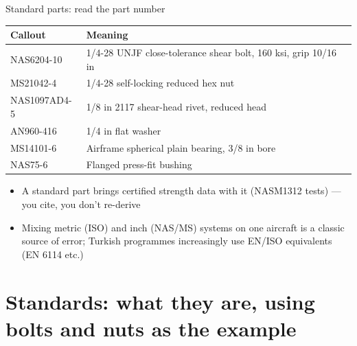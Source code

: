 \documentclass[aspectratio=169,10pt]{beamer}
\begin{document}
\begin{frame}{Standard parts: read the part number}
\footnotesize
\begin{tabular}{@{}ll@{}}
\toprule
Callout & Meaning \\
\midrule
NAS6204-10 & 1/4-28 UNJF close-tolerance shear bolt, 160 ksi, grip 10/16 in \\
MS21042-4 & 1/4-28 self-locking reduced hex nut \\
NAS1097AD4-5 & 1/8 in 2117 shear-head rivet, reduced head \\
AN960-416 & 1/4 in flat washer \\
MS14101-6 & Airframe spherical plain bearing, 3/8 in bore \\
NAS75-6 & Flanged press-fit bushing \\
\bottomrule
\end{tabular}
\vspace{6pt}

\begin{itemize}
  \item A standard part brings certified strength data with it (NASM1312 tests) --- you cite, you don't re-derive
  \item Mixing metric (ISO) and inch (NAS/MS) systems on one aircraft is a classic source of error; Turkish programmes increasingly use EN/ISO equivalents (EN 6114 etc.)
\end{itemize}
\end{frame}


\section{Standards: what they are, using bolts and nuts as the example}
\end{document}

